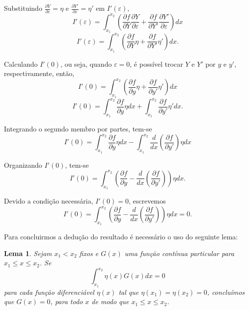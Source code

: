 \documentclass{beamer}
\newtheorem{lema}{Lema}
\begin{document}
	\begin{frame}
		\justify
	
		Substituindo $\frac{\partial Y}{\partial \varepsilon}=\eta$ e $\frac{\partial Y'}{\partial \varepsilon}=\eta'$ em $I'(\varepsilon)$,
		$$
			I'(\varepsilon)=\int_{x_1}^{x_2}\left ( \frac{\partial f}{\partial Y}\frac{\partial Y}{\partial \varepsilon} + \frac{\partial f}{\partial Y'}\frac{\partial Y'}{\partial \varepsilon} \right ) dx
		$$
		\pause
		$$
			I'(\varepsilon)=\int_{x_1}^{x_2}\left ( 
				\frac{\partial f}{\partial Y} \eta +
				\frac{\partial f}{\partial Y'} \eta '
			\right )dx \text{.}
		$$
	\end{frame}

	\begin{frame}
		\justify
	
		Calculando $I'(0)$, ou seja, quando $\varepsilon=0$, é possível trocar $Y$ e $Y'$ por $y$ e $y'$, respectivamente, então,
		$$
			I'(0)=\int_{x_1}^{x_2}\left (
				\frac{\partial f}{\partial y} \eta +
				\frac{\partial f}{\partial y'} \eta '
			\right )dx
		$$
		\pause
		$$
			I'(0)=
				\int_{x_1}^{x_2} \frac{\partial f}{\partial y}\eta dx
				+
				\int_{x_1}^{x_2} \frac{\partial f}{\partial y'}\eta' dx \text{.}
		$$
		\pause
	
		Integrando o segundo membro por partes, tem-se
		$$
		I'(0)=
			\int_{x_1}^{x_2} \frac{\partial f}{\partial y}\eta dx
			-
			\int_{x_1}^{x_2} \frac{d}{dx} \left ( \frac{\partial f}{\partial y'} \right ) \eta dx
		$$
	\end{frame}
	
	\begin{frame}
		\justify
	
		Organizando $I'(0)$, tem-se
		$$
			I'(0)=\int_{x_1}^{x_2}\left (
				\frac{\partial f}{\partial y} -
				\frac{d}{dx}
				\left (
					\frac{\partial f}{\partial y'}
				\right )
			\right )\eta dx
			\text{.}
		$$
		\pause
		
		Devido a condição necessária, $I'(0)=0$, escrevemos
		$$
			I'(0)=\int_{x_1}^{x_2}\left (
				\frac{\partial f}{\partial y} -
				\frac{d}{dx}
				\left (
					\frac{\partial f}{\partial y'}
				\right )
			\right )\eta dx = 0
			\text{.}
		$$
	\end{frame}

	\begin{frame}
		\justify
		Para concluirmos a dedução do resultado é necessário o uso do seguinte lema:
	
		\begin{lema}
			\justify
			Sejam $x_1 < x_2$ fixos e $G(x)$ uma função contínua particular para $x_1 \leqslant x \leqslant x_2$. Se $$\int_{x_1}^{x_2} \eta (x) G(x) dx = 0$$ para cada função diferenciável $\eta (x)$ tal que $\eta (x_1)=\eta (x_2)=0$, concluímos que $G(x)=0$, para todo $x$ de modo que $x_1 \leqslant x \leqslant x_2$.
		\end{lema}	
	
	\end{frame}
\end{document}
